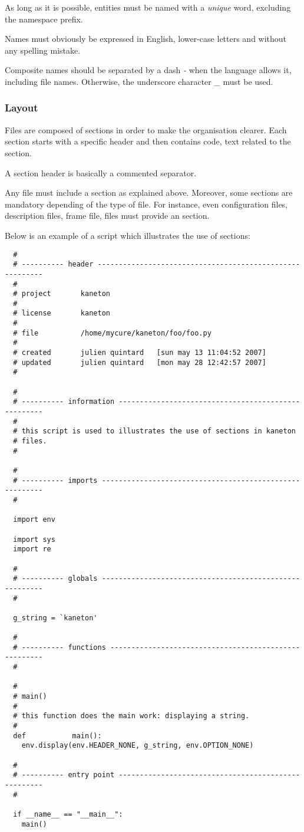As long as it is possible, entities must be named with a \textit{unique}
word, excluding the namespace prefix.

Names must obviously be expressed in English, lower-case letters and
without any spelling mistake.

Composite names should be separated by a dash \textit{-} when the language
allows it, including file names. Otherwise, the underscore character
\textit{\_} must be used.


\subsubsection{Layout}

Files are composed of sections in order to make the organisation clearer.
Each section starts with a specific header and then contains code, text \etc{}
related to the section.

A section header is basically a commented separator.

Any file must include a  section as explained above. Moreover,
some sections are mandatory depending of the type of file. For instance,
even configuration files, description files, frame file, 
files \etc{} must provide an  section.

Below is an example of a  script which illustrates the
use of sections:

\begin{verbatim}
  #
  # ---------- header ---------------------------------------------------------
  #
  # project       kaneton
  #
  # license       kaneton
  #
  # file          /home/mycure/kaneton/foo/foo.py
  #
  # created       julien quintard   [sun may 13 11:04:52 2007]
  # updated       julien quintard   [mon may 28 12:42:57 2007]
  #

  #
  # ---------- information ----------------------------------------------------
  #
  # this script is used to illustrates the use of sections in kaneton
  # files.
  #

  #
  # ---------- imports --------------------------------------------------------
  #

  import env

  import sys
  import re

  #
  # ---------- globals --------------------------------------------------------
  #

  g_string = `kaneton'

  #
  # ---------- functions ------------------------------------------------------
  #

  #
  # main()
  #
  # this function does the main work: displaying a string.
  #
  def			main():
    env.display(env.HEADER_NONE, g_string, env.OPTION_NONE)

  #
  # ---------- entry point ----------------------------------------------------
  #

  if __name__ == "__main__":
    main()
\end{verbatim}

